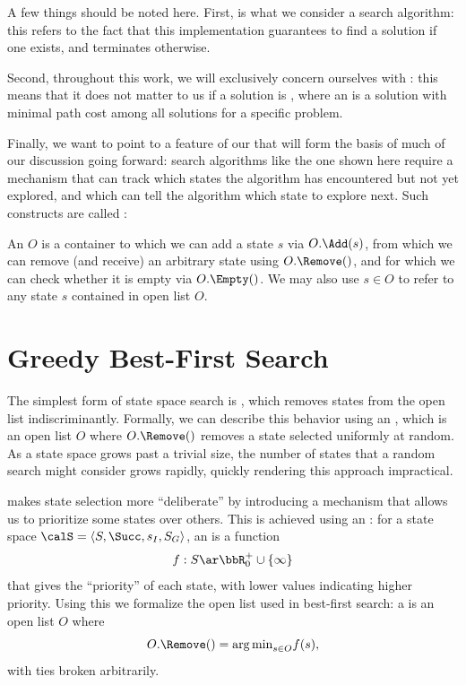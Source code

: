 A few things should be noted here. First,  is what we consider a  search algorithm: this refers to the fact that this implementation guarantees to find a solution if one exists, and terminates otherwise.

Second, throughout this work, we will exclusively concern ourselves with : this means that it does not matter to us if a solution is , where an  is a solution with minimal path cost among all solutions for a specific problem.

Finally, we want to point to a feature of our  that will form the basis of much of our discussion going forward: search algorithms like the one shown here require a mechanism that can track which states the algorithm has encountered but not yet explored, and which can tell the algorithm which state to explore next. Such constructs are called :

An  $O$ is a container to which we can add a state $s$ via $O.\Add(s)$, from which we can remove (and receive) an arbitrary state using $O.\Remove()$, and for which we can check whether it is empty via $O.\Empty()$. We may also use $s\in O$ to refer to any state $s$ contained in open list $O$.



\section{Greedy Best-First Search}
\label{sec:gbfs}

The simplest form of state space search is , which removes states from the open list indiscriminantly. Formally, we can describe this behavior using an , which is an open list $O$ where $O.\Remove()$ removes a state selected uniformly at random. As a state space grows past a trivial size, the number of states that a random search might consider grows rapidly, quickly rendering this approach impractical.

 makes state selection more ``deliberate'' by introducing a mechanism that allows us to prioritize some states over others. This is achieved using an : for a state space $\calS=\langle S,\Succ,s_I,S_G\rangle$, an  is a function $$f:S\ar\bbR_0^+\cup\{\infty\}$$ that gives the ``priority'' of each state, with lower values indicating higher priority. Using this we formalize the open list used in best-first search: a  is an open list $O$ where $$O.\Remove()={\arg\min}_{s\in O}f(s),$$ with ties broken arbitrarily.

